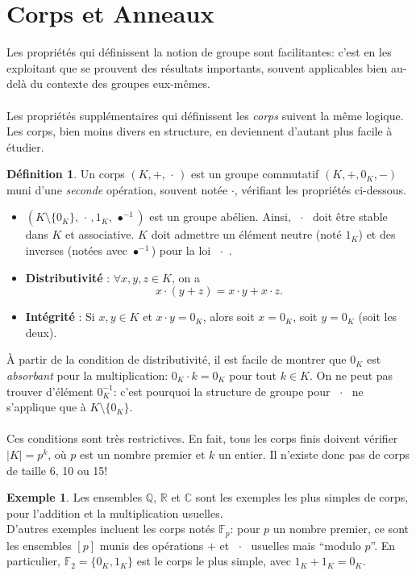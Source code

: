 \documentclass[oneside,12pt,french,table]{book}
\newcommand{\Q}{\mathbb{Q}}
\newcommand{\R}{\mathbb{R}}
\newcommand{\C}{\mathbb{C}}
\theoremstyle{definition}
\theoremstyle{definition}
\newtheorem*{example}{Exemple}
\theoremstyle{definition}
\newtheorem{definition}{Définition}[chapter]
\begin{document}
\section{Corps et Anneaux}
Les propriétés qui définissent la notion de groupe sont facilitantes: c'est en les exploitant que se prouvent des résultats importants, souvent applicables bien au-delà du contexte des groupes eux-mêmes. \\ \\
Les propriétés supplémentaires qui définissent les \textit{corps} suivent la même logique. Les corps, bien moins divers en structure, en deviennent d'autant plus facile à étudier.
\begin{definition}
Un corps $(K, +, \, \cdot \,)$ est un groupe commutatif $(K,+,0_K,-)$ muni d'une \textit{seconde} opération, souvent notée $\cdot$, vérifiant les propriétés ci-dessous. \\ 
\begin{itemize}
    \item $(K \setminus \{0_K\}, \, \cdot \,, 1_K, \, \bullet^{-1})$ est un groupe abélien. Ainsi, \, $\cdot$ \, doit être stable dans $K$ et associative. $K$ doit admettre un élément neutre (noté $1_K$) et des inverses (notées avec $\bullet^{-1}$) pour la loi \, $\cdot$ \,.
    \item \textbf{Distributivité} : $\forall x,y,z \in K$, on a $$x \cdot (y + z) = x \cdot y + x \cdot z.$$
    \item \textbf{Intégrité} : Si $x, y \in K$ et $x \cdot y = 0_K$, alors soit $x = 0_K$, soit $y = 0_K$ (soit les deux).
\end{itemize}
\end{definition}
À partir de la condition de distributivité, il est facile de montrer que $0_K$ est \textit{absorbant} pour la multiplication: $0_K \cdot k = 0_K$ pour tout $k \in K$. On ne peut pas trouver d'élément $0_K^{-1}$: c'est pourquoi la structure de groupe pour \, $\cdot$ \, ne s'applique que à $K \setminus \{0_K\}$. \\ \\
Ces conditions sont très restrictives. En fait, tous les corps finis doivent vérifier $\vert K \vert = p^k$, où $p$ est un nombre premier et $k$ un entier. Il n'existe donc pas de corps de taille 6, 10 ou 15!
\begin{example}
Les ensembles $\Q$, $\R$ et $\C$ sont les exemples les plus simples de corps, pour l'addition et la multiplication usuelles. \\
D'autres exemples incluent les corps notés $\mathbb{F}_p$: pour $p$ un nombre premier, ce sont les ensembles $[p]$ munis des opérations $+$ et \, $\cdot$ \, usuelles mais ``modulo $p$''. En particulier, $\mathbb{F}_2 = \{0_K,1_K\}$ est le corps le plus simple, avec $1_K + 1_K = 0_K$.
\end{example}
\end{document}
